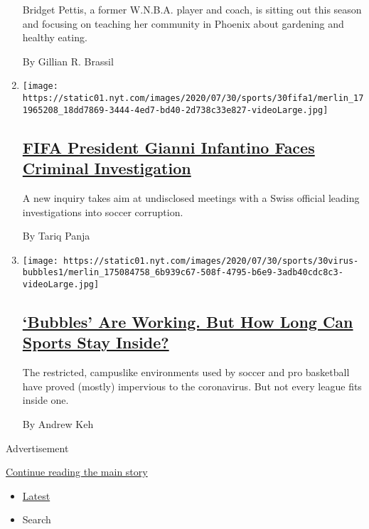 \begin{enumerate}
  Bridget Pettis, a former W.N.B.A. player and coach, is sitting out
  this season and focusing on teaching her community in Phoenix about
  gardening and healthy eating.

  By Gillian R. Brassil
\item
  \texttt{[image: https://static01.nyt.com/images/2020/07/30/sports/30fifa1/merlin\_171965208\_18dd7869-3444-4ed7-bd40-2d738c33e827-videoLarge.jpg]}

  \hypertarget{fifa-president-gianni-infantino-faces-criminal-investigation}{%
  \subsection{\texorpdfstring{\href{/2020/07/30/sports/soccer/fifa-gianni-infantino-investigation.html}{FIFA
  President Gianni Infantino Faces Criminal
  Investigation}}{FIFA President Gianni Infantino Faces Criminal Investigation}}\label{fifa-president-gianni-infantino-faces-criminal-investigation}}

  A new inquiry takes aim at undisclosed meetings with a Swiss official
  leading investigations into soccer corruption.

  By Tariq Panja
\item
  \texttt{[image: https://static01.nyt.com/images/2020/07/30/sports/30virus-bubbles1/merlin\_175084758\_6b939c67-508f-4795-b6e9-3adb40cdc8c3-videoLarge.jpg]}

  \hypertarget{bubbles-are-working-but-how-long-can-sports-stay-inside}{%
  \subsection{\texorpdfstring{\href{/2020/07/30/sports/basketball/sports-bubble-nba-mlb.html}{`Bubbles'
  Are Working. But How Long Can Sports Stay
  Inside?}}{`Bubbles' Are Working. But How Long Can Sports Stay Inside?}}\label{bubbles-are-working-but-how-long-can-sports-stay-inside}}

  The restricted, campuslike environments used by soccer and pro
  basketball have proved (mostly) impervious to the coronavirus. But not
  every league fits inside one.

  By Andrew Keh
\end{enumerate}

Advertisement

\protect\hyperlink{after-mid1}{Continue reading the main story}

\begin{itemize}
\tightlist
\item
  \protect\hyperlink{stream-panel}{Latest}
\item
  Search
\end{itemize}

